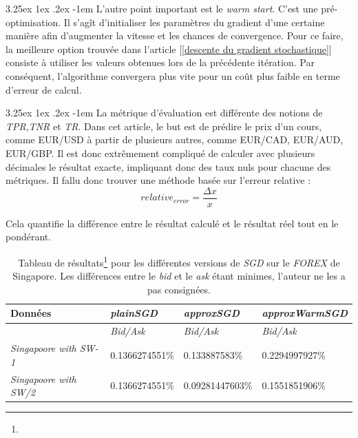 \documentclass[a4paper, 11pt]{article}
\makeatletter
\newcounter{subsubsubsection}[subsubsection]
\renewcommand\paragraph{\@startsection{paragraph}{5}{\z@}%
  {3.25ex \@plus1ex \@minus.2ex}%
  {-1em}%
  {\normalfont\normalsize\bfseries}}
\makeatother
\begin{document}

\paragraph{}
L'autre point important est le \textit{warm start}. C'est une pré-optimisation. Il s'agît d'initialiser les paramètres du gradient d'une certaine manière afin d'augmenter la vitesse et les chances de convergence. Pour ce faire, la meilleure option trouvée dans l'article [\ref{descente du gradient stochastique}] consiste à utiliser les valeurs obtenues lors de la précédente itération.
Par conséquent, l'algorithme convergera plus vite pour un coût plus faible en terme d'erreur de calcul.

\paragraph{}
La métrique d'évaluation est différente des notions de \textit{TPR},\textit{TNR} et \textit{TR}. Dans cet article, le but est de prédire le prix d'un cours, comme EUR/USD à partir de plusieurs autres, comme EUR/CAD, EUR/AUD, EUR/GBP. Il est donc extrêmement compliqué de calculer avec plusieurs décimales le résultat exacte, impliquant donc des taux nuls pour chacune des métriques.
Il fallu donc trouver une méthode basée sur l'erreur relative :
$$relative_{error} = \frac{\Delta x}{x}$$

Cela quantifie la différence entre le résultat calculé et le résultat réel tout en le pondérant.


\begin{table}[H]
	\centering
\begin{tabular}{|l|l|l|l|}
	\hline
	Données & \textit{plainSGD} & \textit{approxSGD} & \textit{approxWarmSGD}\\
	\hline
	\ & \textit{Bid/Ask} & \textit{Bid/Ask} & \textit{Bid/Ask} \\
	\hline
	\textit{Singapoore with SW-1\footnotemark{}} & 0.1366274551\% & 0.133887583\% & 0.2294997927\% \\
	\hline
	\textit{Singapoore with SW/2\footnotemark{}} & 0.1366274551\% & 0.09281447603\% & 0.1551851906\%\\
	\hline

\end{tabular}
\caption[]{Tableau de résultats\footnote[3]{} pour les différentes versions de \textit{SGD} sur le \textit{FOREX} de Singapore. Les différences entre le \textit{bid} et le \textit{ask} étant minimes, l'auteur ne les a pas consignées.}
\end{table}
\end{document}

